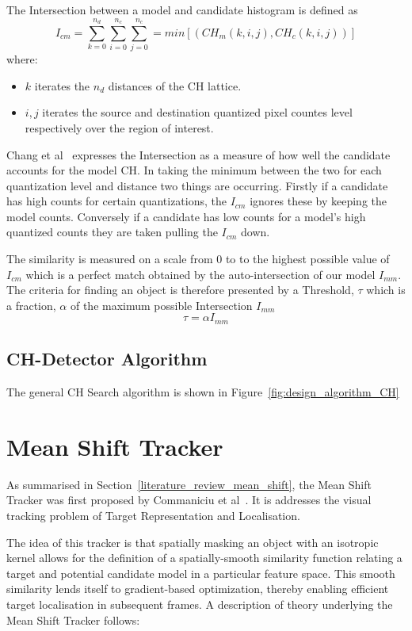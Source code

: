 The Intersection between a model and candidate histogram is defined as
$$I_{cm} = \sum_{k=0}^{n_d}\sum_{i=0}^{n_c}\sum_{j=0}^{n_c} = min[(CH_m(k,i,j),CH_c(k,i,j))]$$
where:
\begin{itemize}
    \item $k$ iterates the $n_d$ distances of the CH lattice.
    \item $i,j$ iterates the source and destination quantized pixel countes level respectively over the
        region of interest.
\end{itemize}
Chang et al~\cite{Chang1999} expresses the Intersection as a measure of how well the
candidate accounts for the model CH\@. In taking the minimum between the two
for each quantization level and distance two things are occurring. Firstly if a
candidate has high counts for certain quantizations, the $I_{cm}$ ignores these
by keeping the model counts. Conversely if a candidate has low counts for a
model's high quantized counts they are taken pulling the $I_{cm}$ down.

The similarity is measured on a scale from 0 to to the highest possible value of
$I_{cm}$ which is a perfect match obtained by the auto-intersection of our
model $I_{mm}$.
The criteria for finding an object is therefore presented by a Threshold, $\tau$ which
is a fraction, $\alpha$ of the maximum possible Intersection $I_{mm}$
$$\tau=\alpha I_{mm}$$


\subsection{CH-Detector Algorithm}
The general CH Search algorithm is shown in Figure~\ref{fig:design_algorithm_CH}


\section{Mean Shift Tracker}\label{theoretical_framework_mean_shift_tracker}
As summarised in Section~\ref{literature_review_mean_shift}, the Mean Shift Tracker was
first proposed by Commaniciu et al~\cite{Comaniciu2003}. It is addresses the
visual tracking problem of Target Representation and Localisation.

The idea of this tracker is that spatially masking an object with an
isotropic kernel allows for the definition of a spatially-smooth similarity
function relating a target and potential candidate model in a particular feature
space. This smooth similarity lends itself to gradient-based optimization,
thereby enabling efficient target localisation in subsequent frames.
A description of theory underlying the Mean Shift Tracker follows:

